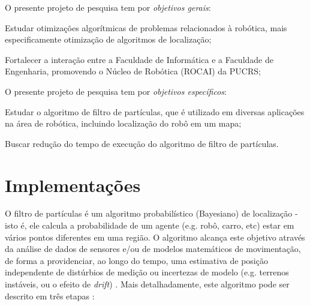 \documentclass[
	12pt,				%
	openright,			%
	oneside,			%
	a4paper,			%
	english,			%
	french,				%
	spanish,			%
	brazil,				%
	]{abntex2}
\begin{document}
O presente projeto de pesquisa tem por \emph{objetivos gerais}:
\begin{alineas}
\item Estudar otimizações algorítmicas de problemas relacionados à robótica, mais especificamente otimização de algoritmos de localização;
\item Fortalecer a interação entre a Faculdade de Informática e a Faculdade de Engenharia, promovendo o Núcleo de Robótica (ROCAI) da PUCRS;
\end{alineas}

O presente projeto de pesquisa tem por \emph{objetivos específicos}:
\begin{alineas}
\item Estudar o algoritmo de filtro de partículas, que é utilizado em diversas aplicações na área de robótica, incluindo localização do robô em um mapa;
\item Buscar redução do tempo de execução do algoritmo de filtro de partículas.
\end{alineas}

\chapter[Implementações]{Implementações}
\label{chap:implementações}

O filtro de partículas \cite{CAN11,HAU12} é um algoritmo probabilístico (Bayesiano) de localização - isto é, ele calcula a probabilidade de um agente (e.g. robô, carro, etc) estar em vários pontos diferentes em uma região. O algoritmo alcança este objetivo através da análise de dados de sensores e/ou de modelos matemáticos de movimentação, de forma a providenciar, ao longo do tempo, uma estimativa de posição independente de distúrbios de medição ou incertezas de modelo (e.g. terrenos instáveis, ou o efeito de \emph{drift}) \cite{pftuto}. Mais detalhadamente, este algoritmo pode ser descrito em três etapas \cite{pftuto}:
\end{document}
